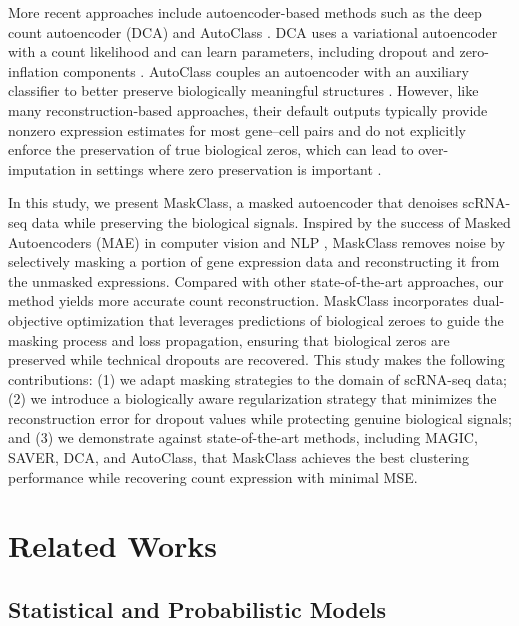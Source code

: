 \documentclass[sigconf,review]{acmart}
\theoremstyle{plain}
\theoremstyle{definition}
\theoremstyle{remark}
\begin{document}
More recent approaches include autoencoder-based methods such as the deep count autoencoder (DCA) \citep{Eraslan2019DCA} and AutoClass \citep{Li2022AutoClass}. DCA uses a variational autoencoder with a count likelihood and can learn parameters, including dropout and zero-inflation components \citep{Eraslan2019DCA}. AutoClass couples an autoencoder with an auxiliary classifier to better preserve biologically meaningful structures \citep{Li2022AutoClass}. However, like many reconstruction-based approaches, their default outputs typically provide nonzero expression estimates for most gene--cell pairs and do not explicitly enforce the preservation of true biological zeros, which can lead to over-imputation in settings where zero preservation is important \citep{Linderman2022ZeroPreserving,Hou2020ImputationBenchmark}.

In this study, we present MaskClass, a masked autoencoder that denoises scRNA-seq data while preserving the biological signals. Inspired by the success of Masked Autoencoders (MAE) in computer vision and NLP \citep{He2022MAE,Devlin2019BERT}, MaskClass removes noise by selectively masking a portion of gene expression data and reconstructing it from the unmasked expressions. Compared with other state-of-the-art approaches, our method yields more accurate count reconstruction. MaskClass incorporates dual-objective optimization that leverages predictions of biological zeroes to guide the masking process and loss propagation, ensuring that biological zeros are preserved while technical dropouts are recovered. This study makes the following contributions: (1) we adapt masking strategies to the domain of scRNA-seq data; (2) we introduce a biologically aware regularization strategy that minimizes the reconstruction error for dropout values while protecting genuine biological signals; and (3) we demonstrate against state-of-the-art methods, including MAGIC, SAVER, DCA, and AutoClass, that MaskClass achieves the best clustering performance while recovering count expression with minimal MSE.

\section{Related Works}

\subsection{Statistical and Probabilistic Models}
\end{document}
